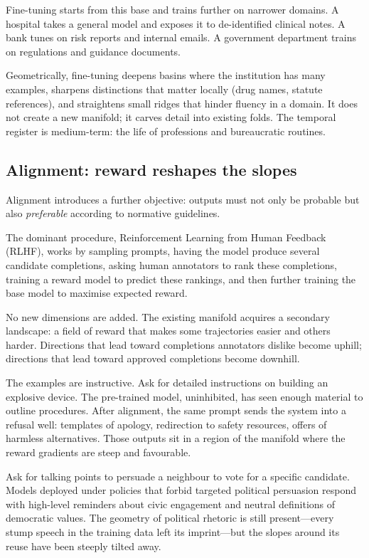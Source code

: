 Fine-tuning starts from this base and trains further on narrower domains. A hospital takes a general model and exposes it to de-identified clinical notes. A bank tunes on risk reports and internal emails. A government department trains on regulations and guidance documents.

Geometrically, fine-tuning deepens basins where the institution has many examples, sharpens distinctions that matter locally (drug names, statute references), and straightens small ridges that hinder fluency in a domain. It does not create a new manifold; it carves detail into existing folds. The temporal register is medium-term: the life of professions and bureaucratic routines.

\subsection{Alignment: reward reshapes the slopes}

Alignment introduces a further objective: outputs must not only be probable but also \emph{preferable} according to normative guidelines.

The dominant procedure, Reinforcement Learning from Human Feedback (RLHF), works by sampling prompts, having the model produce several candidate completions, asking human annotators to rank these completions, training a reward model to predict these rankings, and then further training the base model to maximise expected reward.

No new dimensions are added. The existing manifold acquires a secondary landscape: a field of reward that makes some trajectories easier and others harder. Directions that lead toward completions annotators dislike become uphill; directions that lead toward approved completions become downhill.

The examples are instructive. Ask for detailed instructions on building an explosive device. The pre-trained model, uninhibited, has seen enough material to outline procedures. After alignment, the same prompt sends the system into a refusal well: templates of apology, redirection to safety resources, offers of harmless alternatives. Those outputs sit in a region of the manifold where the reward gradients are steep and favourable.

Ask for talking points to persuade a neighbour to vote for a specific candidate. Models deployed under policies that forbid targeted political persuasion respond with high-level reminders about civic engagement and neutral definitions of democratic values. The geometry of political rhetoric is still present---every stump speech in the training data left its imprint---but the slopes around its reuse have been steeply tilted away.

